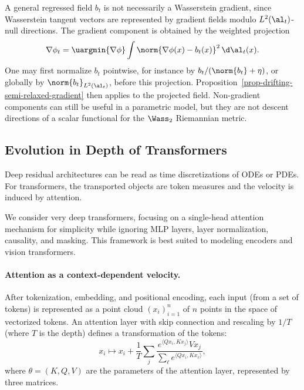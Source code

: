 \begin{rem}
	A general regressed field $b_t$ is not necessarily a Wasserstein gradient, since Wasserstein tangent vectors are represented by gradient fields modulo $L^2(\al_t)$-null directions. The gradient component is obtained by the weighted projection
	\[
		\nabla\phi_t
		=
		\uargmin{\nabla\phi}
		\int \norm{\nabla\phi(x)-b_t(x)}^2\,\d\al_t(x).
	\]
	One may first normalize $b_t$ pointwise, for instance by $b_t/(\norm{b_t}+\eta)$, or globally by $\norm{b_t}_{L^2(\al_t)}$, before this projection. Proposition~\ref{prop-drifting-semi-relaxed-gradient} then applies to the projected field. Non-gradient components can still be useful in a parametric model, but they are not descent directions of a scalar functional for the $\Wass_2$ Riemannian metric.
\end{rem}

\subsection{Evolution in Depth of Transformers}

Deep residual architectures can be read as time discretizations of ODEs or PDEs. For transformers, the transported objects are token measures and the velocity is induced by attention.

We consider very deep transformers, focusing on a single-head attention mechanism for simplicity while ignoring MLP layers, layer normalization, causality, and masking. This framework is best suited to modeling encoders and vision transformers.

\paragraph{Attention as a context-dependent velocity.}

After tokenization, embedding, and positional encoding, each input (from a set of tokens) is represented as a point cloud $(x_i)_{i=1}^n$ of $n$ points in the space of vectorized tokens. An attention layer with skip connection and rescaling by $1/T$ (where $T$ is the depth) defines a transformation of the tokens:
\begin{equation*}
    x_i \mapsto x_i + \frac{1}{T} \sum_j \frac{e^{\langle Q x_i, K x_j \rangle} V x_j}{\sum_{\ell} e^{\langle Q x_i, K x_\ell \rangle}},
\end{equation*}
where $\theta = (K, Q, V)$ are the parameters of the attention layer, represented by three matrices.

